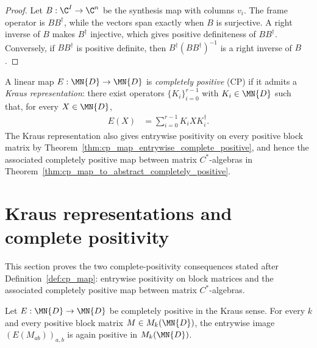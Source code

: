 \begin{proof}\leanok
    Let $B:\C^I\to\C^n$ be the synthesis map with columns $v_i$.
    The frame operator is $BB^\dagger$, while the vectors span exactly when
    $B$ is surjective. A right inverse of $B$ makes $B^\dagger$ injective,
    which gives positive definiteness of $BB^\dagger$. Conversely, if
    $BB^\dagger$ is positive definite, then
    $B^\dagger(BB^\dagger)^{-1}$ is a right inverse of $B$.
\end{proof}

\begin{definition}\label{def:cp_map}
    \leanok
    A linear map $E : \MN{D} \to \MN{D}$ is \emph{completely positive} (CP)
    if it admits a \emph{Kraus representation}: there exist operators
    $\{K_i\}_{i=0}^{r-1}$ with $K_i \in \MN{D}$ such that, for every
    $X \in \MN{D}$,
    \begin{align}
        E(X)
         & = \sum_{i=0}^{r-1} K_i X K_i^\dagger.
        \label{eq:channel_kraus_representation}
    \end{align}
    The Kraus representation also gives entrywise positivity on every positive
    block matrix by Theorem~\ref{thm:cp_map_entrywise_complete_positive}, and hence
    the associated completely positive map between matrix $C^*$-algebras in
    Theorem~\ref{thm:cp_map_to_abstract_completely_positive}.
\end{definition}

\section{Kraus representations and complete positivity}

This section proves the two complete-positivity consequences stated after
Definition~\ref{def:cp_map}: entrywise positivity on block matrices and the
associated completely positive map between matrix $C^*$-algebras.

\begin{theorem}
    \label{thm:cp_map_entrywise_complete_positive}
    \leanok
    Let $E : \MN{D} \to \MN{D}$ be completely positive in the Kraus sense.
    For every $k$ and every positive block matrix
    $M \in M_k(\MN{D})$, the entrywise image
    $(E(M_{ab}))_{a,b}$ is again positive in $M_k(\MN{D})$.
\end{theorem}

